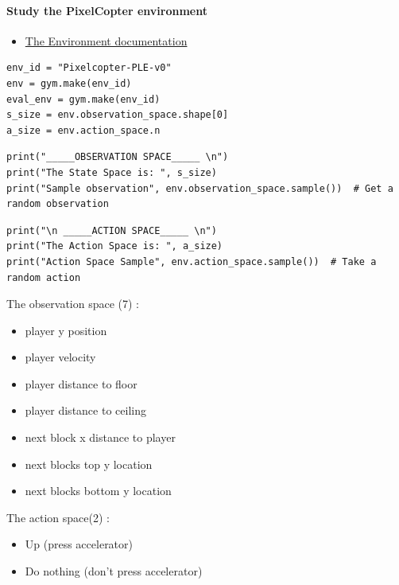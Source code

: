 \documentclass[11pt,a4paper]{article}
\begin{document}
\paragraph{Study the PixelCopter environment}\label{study-the-pixelcopter-environment}

\begin{itemize}
\tightlist
\item
  \href{https://pygame-learning-environment.readthedocs.io/en/latest/user/games/pixelcopter.html}{The Environment documentation}
\end{itemize}

\begin{lstlisting}
env_id = "Pixelcopter-PLE-v0"
env = gym.make(env_id)
eval_env = gym.make(env_id)
s_size = env.observation_space.shape[0]
a_size = env.action_space.n
\end{lstlisting}

\begin{lstlisting}
print("_____OBSERVATION SPACE_____ \n")
print("The State Space is: ", s_size)
print("Sample observation", env.observation_space.sample())  # Get a random observation
\end{lstlisting}

\begin{lstlisting}
print("\n _____ACTION SPACE_____ \n")
print("The Action Space is: ", a_size)
print("Action Space Sample", env.action_space.sample())  # Take a random action
\end{lstlisting}

The observation space (7) :

\begin{itemize}
\tightlist
\item
  player y position
\item
  player velocity
\item
  player distance to floor
\item
  player distance to ceiling
\item
  next block x distance to player
\item
  next blocks top y location
\item
  next blocks bottom y location
\end{itemize}

The action space(2) :

\begin{itemize}
\tightlist
\item
  Up (press accelerator)
\item
  Do nothing (don't press accelerator)
\end{itemize}
\end{document}

